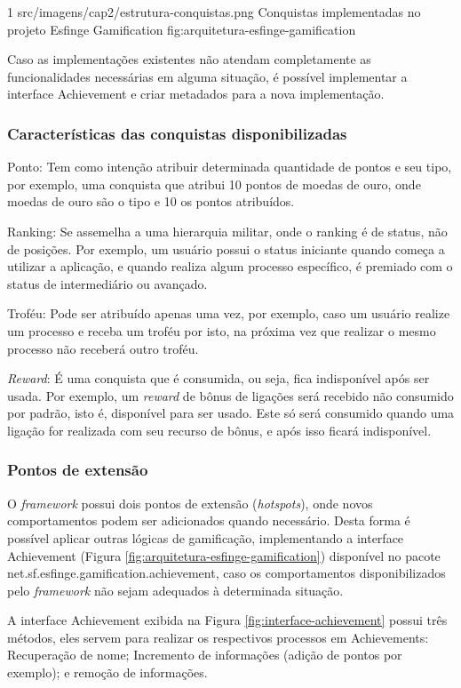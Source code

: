 \begin{image}
{1} %
{src/imagens/cap2/estrutura-conquistas.png} %
{Conquistas implementadas no projeto Esfinge Gamification} %
{fig:arquitetura-esfinge-gamification} %
{} %
\end{image}

\par Caso as implementações existentes não atendam completamente as funcionalidades necessárias em alguma situação, é possível implementar a interface Achievement e criar metadados para a nova implementação.

\subsubsection{Características das conquistas disponibilizadas}

\par Ponto: Tem como intenção atribuir determinada quantidade de pontos e seu tipo, por exemplo, uma conquista que atribui 10 pontos de moedas de ouro, onde moedas de ouro são o tipo e 10 os pontos atribuídos. 
\par Ranking: Se assemelha a uma hierarquia militar, onde o ranking é de status, não de posições. Por exemplo, um usuário possui o status iniciante quando começa a utilizar a aplicação, e quando realiza algum processo específico, é premiado com o status de intermediário ou avançado.

\par Troféu: Pode ser atribuído apenas uma vez, por exemplo, caso um usuário realize um processo e receba um troféu por isto, na próxima vez que realizar o mesmo processo não receberá outro troféu.

\par \textit{Reward}: É uma conquista que é consumida, ou seja, fica indisponível após ser usada. Por exemplo, um \textit{reward} de bônus de ligações será recebido não consumido por padrão, isto é, disponível para ser usado. Este só será consumido quando uma ligação for realizada com seu recurso de bônus, e após isso ficará indisponível.

\subsubsection{Pontos de extensão}

\par O \textit{framework} possui dois pontos de extensão (\textit{hotspots}), onde novos comportamentos podem ser adicionados quando necessário. Desta forma é possível aplicar outras lógicas de gamificação, implementando a interface Achievement (Figura \ref{fig:arquitetura-esfinge-gamification}) disponível no pacote net.sf.esfinge.gamification.achievement, caso os comportamentos disponibilizados pelo \textit{framework} não sejam adequados \`a determinada situação. 
\par A interface Achievement exibida na Figura \ref{fig:interface-achievement} possui três métodos, eles servem para realizar os respectivos processos em Achievements: Recuperação de nome; Incremento de informações (adição de pontos por exemplo); e remoção de informações.

